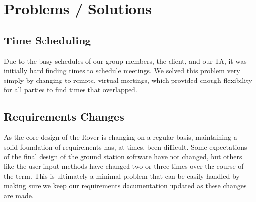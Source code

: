 \section{Problems / Solutions}
\subsection{Time Scheduling}
Due to the busy schedules of our group members, the client, and our TA, it was initially hard finding times to schedule meetings.
We solved this problem very simply by changing to remote, virtual meetings, which provided enough flexibility for all parties to find times that overlapped. 

\subsection{Requirements Changes}
As the core design of the Rover is changing on a regular basis, maintaining a solid foundation of requirements has, at times, been difficult.
Some expectations of the final design of the ground station software have not changed, but others like the user input methods have changed two or three times over the course of the term.
This is ultimately a minimal problem that can be easily handled by making sure we keep our requirements documentation updated as these changes are made.